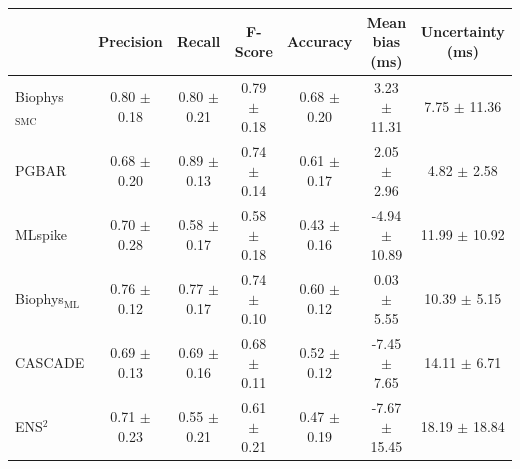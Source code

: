 \documentclass{article}
\begin{document}
\noindent
\begin{minipage}{\textwidth}
\raggedright
\begin{tabular}{lcccccc}
\toprule
 & Precision & Recall & F-Score & Accuracy & Mean bias (ms) & Uncertainty (ms) \\
\midrule
\textcolor[HTML]{009E73}{Biophys$_\mathrm{SMC}$} & 0.80 $\pm$ 0.18 & 0.80 $\pm$ 0.21 & 0.79 $\pm$ 0.18 & 0.68 $\pm$ 0.20 & 3.23 $\pm$ 11.31 & 7.75 $\pm$ 11.36 \\
\textcolor[HTML]{4A4A4A}{PGBAR} & 0.68 $\pm$ 0.20 & 0.89 $\pm$ 0.13 & 0.74 $\pm$ 0.14 & 0.61 $\pm$ 0.17 & 2.05 $\pm$ 2.96 & 4.82 $\pm$ 2.58 \\
\textcolor[HTML]{0072B2}{MLspike} & 0.70 $\pm$ 0.28 & 0.58 $\pm$ 0.17 & 0.58 $\pm$ 0.18 & 0.43 $\pm$ 0.16 & -4.94 $\pm$ 10.89 & 11.99 $\pm$ 10.92 \\
\textcolor[HTML]{007755}{Biophys$_\mathrm{ML}$} & 0.76 $\pm$ 0.12 & 0.77 $\pm$ 0.17 & 0.74 $\pm$ 0.10 & 0.60 $\pm$ 0.12 & 0.03 $\pm$ 5.55 & 10.39 $\pm$ 5.15 \\
\textcolor[HTML]{F3AE14}{CASCADE} & 0.69 $\pm$ 0.13 & 0.69 $\pm$ 0.16 & 0.68 $\pm$ 0.11 & 0.52 $\pm$ 0.12 & -7.45 $\pm$ 7.65 & 14.11 $\pm$ 6.71 \\
\textcolor[HTML]{A6780C}{ENS$^\mathrm{2}$} & 0.71 $\pm$ 0.23 & 0.55 $\pm$ 0.21 & 0.61 $\pm$ 0.21 & 0.47 $\pm$ 0.19 & -7.67 $\pm$ 15.45 & 18.19 $\pm$ 18.84 \\
\bottomrule
\end{tabular}
\end{minipage}
\end{document}
